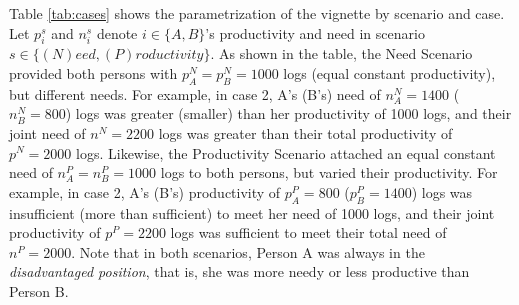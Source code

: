 \documentclass[smallcondensed]{svjour3}
\begin{document}
Table \ref{tab:cases} shows the parametrization of the vignette by scenario and case. Let $p_i^s$ and $n_i^s$ denote $i\in\{A,B\}$'s productivity and need in scenario $s\in\{(N)eed,(P)roductivity\}$. As shown in the table, the Need Scenario provided both persons with $p_A^N=p_B^N=1000$ logs (equal constant productivity), but different needs. For example, in case 2, A's (B's) need of $n^N_A=1400$ ($n^N_B=800$) logs was greater (smaller) than her productivity of 1000 logs, and their joint need of $n^N=2200$ logs was greater than their total productivity of $p^N=2000$ logs. Likewise, the Productivity Scenario attached an equal constant need of $n^P_A=n^P_B=1000$ logs to both persons, but varied their productivity. For example, in case 2, A's (B's) productivity of $p^P_A=800$ ($p^P_B=1400$) logs was insufficient (more than sufficient) to meet her need of 1000 logs, and their joint productivity of $p^P=2200$ logs was sufficient to meet their total need of $n^P=2000$. Note that in both scenarios, Person A was always in the \textit{disadvantaged position}, that is, she was more needy or less productive than Person B.\par
%
\end{document}
